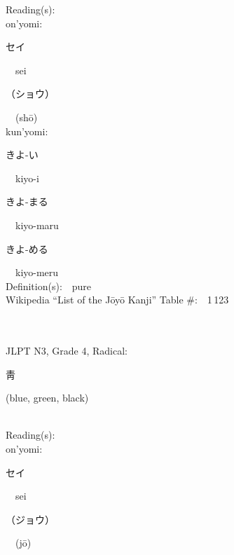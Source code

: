 \begin{multicols}{2}
Reading(s):\ \ \\
{\hspace*{1em}}on'yomi:\ \ \\
{\hspace*{2em}}{\begin{CJK}{UTF8}{min} セイ \end{CJK}}\ \ sei\ \ \\
{\hspace*{2em}}{\begin{CJK}{UTF8}{min} （ショウ） \end{CJK}}\ \ (sh\=o)\ \ \\
{\hspace*{1em}}kun'yomi:\ \ \\
{\hspace*{2em}}{\begin{CJK}{UTF8}{min} きよ-い \end{CJK}}\ \ kiyo-i\ \ \\
{\hspace*{2em}}{\begin{CJK}{UTF8}{min} きよ-まる \end{CJK}}\ \ kiyo-maru\ \ \\
{\hspace*{2em}}{\begin{CJK}{UTF8}{min} きよ-める \end{CJK}}\ \ kiyo-meru\ \ \\
Definition(s):\ \ pure \\
Wikipedia ``List of the J\=oy\=o Kanji'' Table \#:\ \ 1\,123 \\
\ \ \\
{\fontsize{34pt}{40pt}  }\ \ \\  %
{JLPT N3, Grade 4, Radical:\ \ {\begin{CJK}{UTF8}{min} 靑 \end{CJK}} (blue, green, black) } \\
Reading(s):\ \ \\
{\hspace*{1em}}on'yomi:\ \ \\
{\hspace*{2em}}{\begin{CJK}{UTF8}{min} セイ \end{CJK}}\ \ sei\ \ \\
{\hspace*{2em}}{\begin{CJK}{UTF8}{min} （ジョウ） \end{CJK}}\ \ (j\=o)\ \ \\

\end{multicols}
